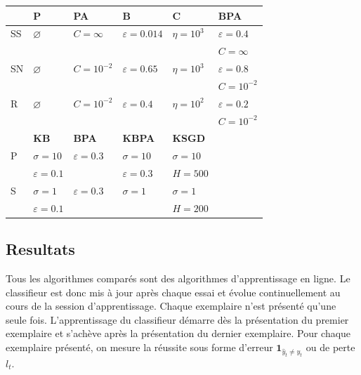 \documentclass[twocolumn]{article}
\begin{document}
\begin{table}[h]
\begin{small}
\begin{tabular}{llllll}
			\hline
			{\bf }  & {\bf P} & {\bf PA } & {\bf B}& {\bf C} & {\bf BPA}\\
			\hline
			SS & $\varnothing$ & $C=\infty$ & $\varepsilon = 0.014$ &$\eta = 10^3$ & $\varepsilon = 0.4$\\
			&&&&& $C = \infty$\\
			
			SN & $\varnothing$ & $C=10^{-2}$ & $\varepsilon =0.65$ & $\eta = 10^3$& $\varepsilon = 0.8$\\
			&&&&& $C = 10^{-2}$\\			
			R & $\varnothing$ & $C=10^{-2}$ & $\varepsilon =0.4$ & $\eta = 10^2$ & $\varepsilon = 0.2$\\
			&&&&& $C = 10^{-2}$\\
			\hline
			&{\bf KB} & {\bf BPA} & {\bf KBPA} &{\bf KSGD}\\
			\hline
			P & $\sigma = 10$ & $\varepsilon = 0.3$ &$\sigma = 10$&$\sigma = 10$\\
			&$\varepsilon =0.1$&& $\varepsilon = 0.3$ & $H = 500$\\
			S & $\sigma = 1$ & $\varepsilon = 0.3$ & $\sigma = 1$&$\sigma = 1$\\
			&$\varepsilon =0.1$&& & $H = 200$\\
			
			
		\end{tabular}
	\end{small}
\end{table}

\subsection{Resultats}

Tous les algorithmes comparés sont des algorithmes d'apprentissage en ligne. Le classifieur est donc mis à jour après chaque essai et évolue continuellement au cours de la session d'apprentissage. Chaque exemplaire n'est présenté qu'une seule fois. L'apprentissage du classifieur démarre dès la présentation du premier exemplaire et s'achève après la présentation du dernier exemplaire. Pour chaque exemplaire présenté, on mesure la réussite sous forme d'erreur $\mathbf{1}_{\hat{y}_t\neq y_t}$ ou de perte $l_t$. 
\end{document}
